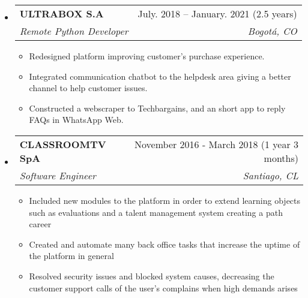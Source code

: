 \documentclass[letterpaper,12pt]{article}[leftmargin=*]
\makeatletter
\def \entryspacing {-0pt}
\renewcommand{\section}[2]{\vspace{5pt}
  \colorbox{secondary}{\color{white}\raggedbottom\normalsize\textbf{{#1}{\hspace{7pt}#2}}}
}
\newcommand{\resumeEntryStart}{\begin{itemize}[leftmargin=2.5mm]}
\newcommand{\resumeEntryEnd}{\end{itemize}\vspace{\entryspacing}}
\newcommand{\resumeItemListStart}{\begin{itemize}[leftmargin=4.5mm]}
\newcommand{\resumeItemListEnd}{\end{itemize}}
\newcommand{\resumeItem}[1]{
  \item\small{
    {#1 \vspace{-2pt}}
  }
}
\newcommand{\resumeEntryTSDL}[4]{
  \vspace{-1pt}\item[]
    \begin{tabularx}{0.97\textwidth}{X@{\hspace{60pt}}r}
      \textbf{\color{primary}#1} & {\firabook\color{accent}\small#2} \\
      \textit{\color{accent}\small#3} & \textit{\color{accent}\small#4} \\
    \end{tabularx}\vspace{-6pt}
}
\makeatother
\begin{document}
  \resumeEntryStart
    \resumeEntryTSDL
      {ULTRABOX S.A}{July. 2018 -- January. 2021 (2.5 years)}
      {Remote Python Developer}{Bogotá, CO}
    \resumeItemListStart
    Import and transport product company to Colombia and other latinamerican countries. It integrates international e-commerce and several payment methods.

      \resumeItem {Redesigned platform improving customer’s purchase experience.}
      \resumeItem {Integrated communication chatbot to the helpdesk area giving a better channel to help customer issues.}
      \resumeItem {Constructed a webscraper to Techbargains, and an short app to reply FAQs in WhatsApp Web.}
    \resumeItemListEnd
  \resumeEntryEnd


  \resumeEntryStart
    \resumeEntryTSDL
      {CLASSROOMTV SpA}{November 2016 - March 2018 (1 year 3 months)}
      {Software Engineer}{Santiago, CL}
    \resumeItemListStart
        E-learning Company, integrated with SENCE (state entity) with custom course and own audiovisual production

      \resumeItem {Included new modules to the platform in order to extend learning objects such as evaluations and a talent management system creating a path career}
      \resumeItem {Created and automate many back office tasks that increase the uptime of the platform in general}
      \resumeItem {Resolved security issues and blocked system causes, decreasing the customer support calls of the user’s complains when high demands arises}
    \resumeItemListEnd
  \resumeEntryEnd


\end{document}
